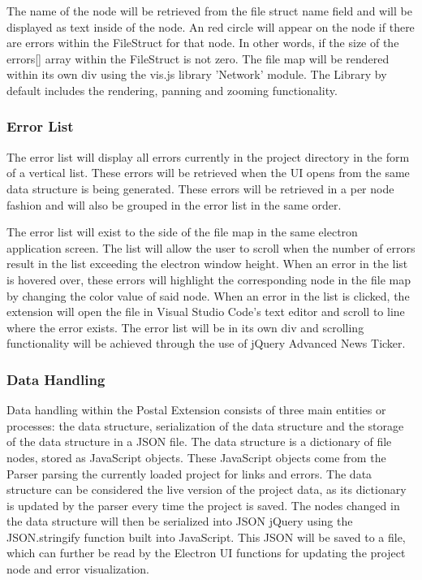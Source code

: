 \documentclass[letterpaper,10pt,titlepage,draftclsnofoot,onecolumn,onesided] {IEEEtran}
\begin{document}
	The name of the node will be retrieved from the file struct name field and will be displayed as text inside of the node.
	An red circle will appear on the node if there are errors within the FileStruct for that node. In other words, if the size of the errors[] array within the FileStruct is not zero.
	The file map will be rendered within its own div using the vis.js library 'Network' module. 
	The Library by default includes the rendering, panning and zooming functionality. \cite{visjs}
	
\subsubsection{Error List}
The error list will display all errors currently in the project directory in the form of a vertical list. 
These errors will be retrieved when the UI opens from the same data structure is being generated. 
These errors will be retrieved in a per node fashion and will also be grouped in the error list in the same order. 

The error list will exist to the side of the file map in the same electron application screen. 
The list will allow the user to scroll when the number of errors result in the list exceeding the electron window height. 
When an error in the list is hovered over, these errors will highlight the corresponding node in the file map by changing the color value of said node. 
When an error in the list is clicked, the extension will open the file in Visual Studio Code's text editor and scroll to line where the error exists.
The error list will be in its own div and scrolling functionality will be achieved through the use of jQuery Advanced News Ticker. \cite{newst}
	
\subsubsection{Data Handling}
Data handling within the Postal Extension consists of three main entities or processes: the data structure, serialization of the data structure and the storage of the data structure in a JSON file.
The data structure is a dictionary of file nodes, stored as JavaScript objects. These JavaScript objects come from the Parser parsing the currently loaded project for links and errors.
The data structure can be considered the live version of the project data, as its dictionary is updated by the parser every time the project is saved. 
The nodes changed in the data structure will then be serialized into JSON jQuery using the JSON.stringify function built into JavaScript.
This JSON will be saved to a file, which can further be read by the Electron UI functions for updating the project node and error visualization. \cite{stringify}
	
\end{document}
